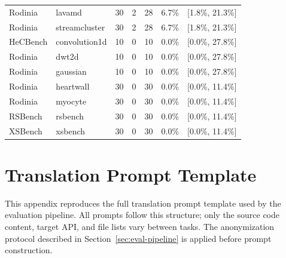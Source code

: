 \begin{table}[htbp]
\begin{tabular}{@{}llrrrrl@{}}
Rodinia & lavamd & 30 & 2 & 28 & 6.7\% & [1.8\%, 21.3\%] \\
Rodinia & streamcluster & 30 & 2 & 28 & 6.7\% & [1.8\%, 21.3\%] \\
\midrule
HeCBench & convolution1d & 10 & 0 & 10 & 0.0\% & [0.0\%, 27.8\%] \\
Rodinia & dwt2d & 10 & 0 & 10 & 0.0\% & [0.0\%, 27.8\%] \\
Rodinia & gaussian & 10 & 0 & 10 & 0.0\% & [0.0\%, 27.8\%] \\
Rodinia & heartwall & 30 & 0 & 30 & 0.0\% & [0.0\%, 11.4\%] \\
Rodinia & myocyte & 30 & 0 & 30 & 0.0\% & [0.0\%, 11.4\%] \\
RSBench & rsbench & 30 & 0 & 30 & 0.0\% & [0.0\%, 11.4\%] \\
XSBench & xsbench & 30 & 0 & 30 & 0.0\% & [0.0\%, 11.4\%] \\
\bottomrule
\end{tabular}
\end{table}


\section{Translation Prompt Template}
\label{sec:appendix-prompt}

This appendix reproduces the full translation prompt template used by the
evaluation pipeline. All prompts follow this structure; only the source code
content, target API, and file lists vary between tasks. The anonymization
protocol described in Section~\ref{sec:eval-pipeline} is applied before
prompt construction.

